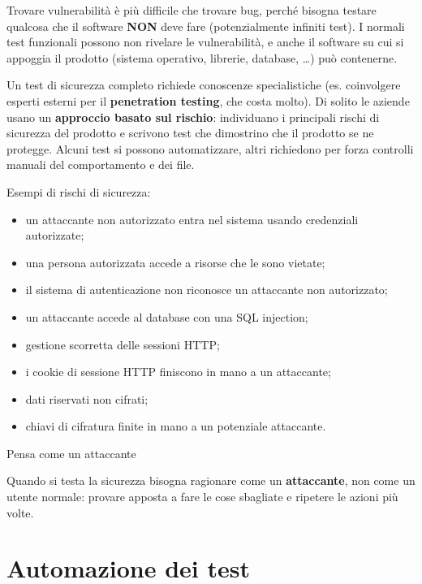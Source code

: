 Trovare vulnerabilità è più difficile che trovare bug, perché bisogna
testare qualcosa che il software \textbf{NON} deve fare (potenzialmente
infiniti test). I normali test funzionali possono non rivelare le
vulnerabilità, e anche il software su cui si appoggia il prodotto
(sistema operativo, librerie, database, \ldots) può contenerne.

Un test di sicurezza completo richiede conoscenze specialistiche (es.
coinvolgere esperti esterni per il \textbf{penetration testing}, che
costa molto). Di solito le aziende usano un \textbf{approccio basato sul
rischio}: individuano i principali rischi di sicurezza del prodotto e
scrivono test che dimostrino che il prodotto se ne protegge. Alcuni test
si possono automatizzare, altri richiedono per forza controlli manuali
del comportamento e dei file.

Esempi di rischi di sicurezza:

\begin{itemize}
\tightlist
\item
  un attaccante non autorizzato entra nel sistema usando credenziali
  autorizzate;
\item
  una persona autorizzata accede a risorse che le sono vietate;
\item
  il sistema di autenticazione non riconosce un attaccante non
  autorizzato;
\item
  un attaccante accede al database con una SQL injection;
\item
  gestione scorretta delle sessioni HTTP;
\item
  i cookie di sessione HTTP finiscono in mano a un attaccante;
\item
  dati riservati non cifrati;
\item
  chiavi di cifratura finite in mano a un potenziale attaccante.
\end{itemize}

\begin{boxtip}{Pensa come un attaccante}

Quando si testa la sicurezza bisogna ragionare come un
\textbf{attaccante}, non come un utente normale: provare apposta a fare
le cose sbagliate e ripetere le azioni più volte.

\end{boxtip}

\section{Automazione dei test}\label{automazione-dei-test}

